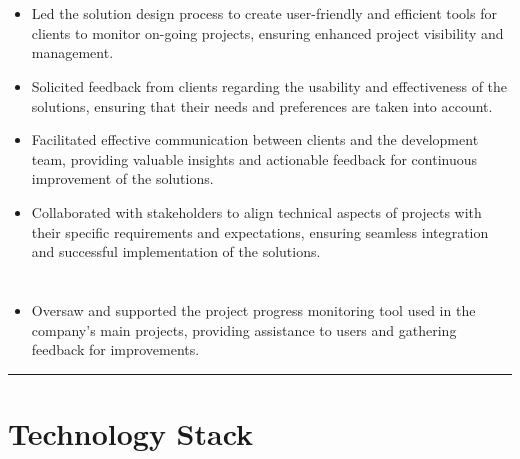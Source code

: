 \documentclass[12pt]{res}
\begin{document}
\begin{resume}
\begin{multicols}{2}
	\section{}
		\begin{itemize}
			\item Led the solution design process to create user-friendly and efficient tools for clients to monitor on-going projects, ensuring enhanced project visibility and management.
\item Solicited feedback from clients regarding the usability and effectiveness of the solutions, ensuring that their needs and preferences are taken into account.
\item Facilitated effective communication between clients and the development team, providing valuable insights and actionable feedback for continuous improvement of the solutions.
\item Collaborated with stakeholders to align technical aspects of projects with their specific requirements and expectations, ensuring seamless integration and successful implementation of the solutions.
		\end{itemize}
	\section{}
		\begin{itemize}
			\setlength{\itemindent}{0pt}
			\item Oversaw and supported the project progress monitoring tool used in the company's main projects, providing assistance to users and gathering feedback for improvements.
		\end{itemize}
\end{multicols}

\vspace{-20pt}
\begin{minipage}[t]{0.55\linewidth}
	\rule{0.25\textwidth}{2pt}
	\begin{multicols}{2}
		\section{Technology Stack}
		\columnbreak
		\section{}
	\end{multicols}
	\vspace{1pt}
\end{minipage}
\hfill
\begin{minipage}[t]{0.42\linewidth}
	\vspace{18pt}

\end{minipage}
\end{resume}
\end{document}

